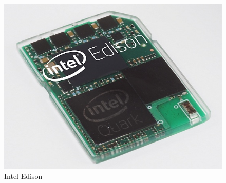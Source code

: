 \begin{figure}[H]
\includegraphics{images/intel-edison-560}

\protect\caption{Intel Edison}


\end{figure}



